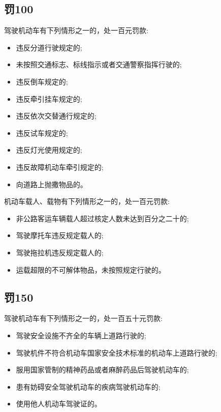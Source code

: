 \subsection{罚100}

\noindent 驾驶机动车有下列情形之一的，处一百元罚款:

\begin{itemize}
    \item 违反分道行驶规定的;
    \item 未按照交通标志、标线指示或者交通警察指挥行驶的;
    \item 违反倒车规定的;
    \item 违反牵引挂车规定的;
    \item 违反依次交替通行规定的;
    \item 违反试车规定的;
    \item 违反灯光使用规定的;
    \item 违反故障机动车牵引规定的;
    \item 向道路上抛撒物品的。
\end{itemize}

\noindent 机动车载人、载物有下列情形之一的，处一百元罚款:

\begin{itemize}
    \item 非公路客运车辆载人超过核定人数未达到百分之二十的;
    \item 驾驶摩托车违反规定载人的;
    \item 驾驶拖拉机违反规定载人的;
    \item 运载超限的不可解体物品，未按照规定行驶的。
\end{itemize}

\subsection{罚150}

\noindent 驾驶机动车有下列情形之一的，处一百五十元罚款:

\begin{itemize}
    \item 驾驶安全设施不齐全的车辆上道路行驶的;
    \item 驾驶机件不符合机动车国家安全技术标准的机动车上道路行驶的;
    \item 服用国家管制的精神药品或者麻醉药品后驾驶机动车的;
    \item 患有妨碍安全驾驶机动车的疾病驾驶机动车的;
    \item 使用他人机动车驾驶证的。
\end{itemize}

